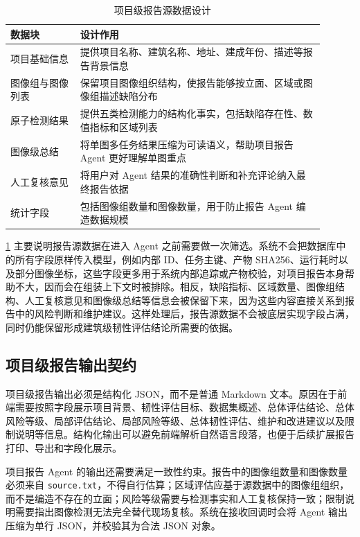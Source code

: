 \begin{table}[!htb]
  \caption{项目级报告源数据设计}\label{tab:design-project-report-source-data}
  \centering
  \begin{tabular}{@{}p{0.2\linewidth}p{0.7\linewidth}@{}} \toprule
    \textbf{数据块} & \textbf{设计作用} \\ \midrule
    项目基础信息 & 提供项目名称、建筑名称、地址、建成年份、描述等报告背景信息 \\
    图像组与图像列表 & 保留项目图像组织结构，使报告能够按立面、区域或图像组描述缺陷分布 \\
    原子检测结果 & 提供五类检测能力的结构化事实，包括缺陷存在性、数值指标和区域列表 \\
    图像级总结 & 将单图多任务结果压缩为可读语义，帮助项目报告 Agent 更好理解单图重点 \\
    人工复核意见 & 将用户对 Agent 结果的准确性判断和补充评论纳入最终报告依据 \\
    统计字段 & 包括图像组数量和图像数量，用于防止报告 Agent 编造数据规模 \\ \bottomrule
  \end{tabular}
\end{table}

\cref{tab:design-project-report-source-data} 主要说明报告源数据在进入 Agent 之前需要做一次筛选。系统不会把数据库中的所有字段原样传入模型，例如内部 ID、任务主键、产物 SHA256、运行耗时以及部分图像坐标，这些字段更多用于系统内部追踪或产物校验，对项目报告本身帮助不大，因而会在组装上下文时被排除。相反，缺陷指标、区域数量、图像组结构、人工复核意见和图像级总结等信息会被保留下来，因为这些内容直接关系到报告中的风险判断和维护建议。这样处理后，报告源数据不会被底层实现字段占满，同时仍能保留形成建筑级韧性评估结论所需要的依据。

\subsection{项目级报告输出契约}
\label{subsec:design-project-report-output-contract}

项目级报告输出必须是结构化 JSON，而不是普通 Markdown 文本。原因在于前端需要按照字段展示项目背景、韧性评估目标、数据集概述、总体评估结论、总体风险等级、局部评估结论、局部风险等级、总体韧性评估、维护和改进建议以及限制说明等信息。结构化输出可以避免前端解析自然语言段落，也便于后续扩展报告打印、导出和字段化展示。

项目报告 Agent 的输出还需要满足一致性约束。报告中的图像组数量和图像数量必须来自 \texttt{source.txt}，不得自行估算；区域评估应基于源数据中的图像组组织，而不是编造不存在的立面；风险等级需要与检测事实和人工复核保持一致；限制说明需要指出图像检测无法完全替代现场复核。系统在接收回调时会将 Agent 输出压缩为单行 JSON，并校验其为合法 JSON 对象。

